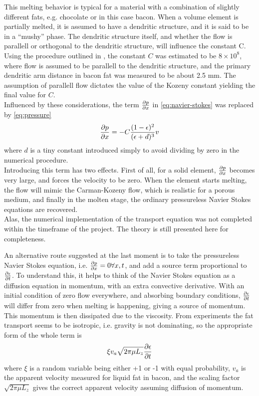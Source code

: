 This melting behavior is typical for a material with a combination of slightly different
fats, e.g. chocolate or in this case bacon. When a volume element is partially
melted, it is assumed to have a dendritic structure, and it is said to be in a
``mushy'' phase. The dendritic structure itself, and whether the flow is parallell or
orthogonal to the dendritic structure, will influence the constant C. \\

Using the procedure outlined in \cite{poirier}, the constant $C$ was estimated to be
$8 \times 10^8$, where flow is assumed to be parallell to the dendritic
structure, and the primary dendritic arm distance in bacon fat was measured to be
about 2.5 mm. The assumption of parallell flow dictates the value of the Kozeny
constant yielding the final value for $C$.\\

Influenced by these considerations, the term $\frac{\partial p}{\partial x}$ in
\cref{eq:navier-stokes} was replaced by \cref{eq:pressure}
\begin{equation}
  \frac{\partial p}{\partial x} =  -C\frac{ (1-\epsilon)^2}{(\epsilon+d)^3} v
  \label{eq:pressure}
\end{equation}
where $d$ is a tiny constant introduced simply to avoid dividing by zero in the
numerical procedure.\\

Introducing this term has two effects. First of all, for a solid element,
$\frac{\partial p}{\partial x}$ becomes very large, and forces the velocity to be zero. When the
element starts melting, the flow will mimic the Carman-Kozeny flow, which is
realistic for a porous medium, and finally in the molten stage, the ordinary
pressureless Navier Stokes equations are recovered.\\

Alas, the numerical implementation of the transport equation was not completed
within the timeframe of the project. The theory is still presented here for
completeness.

An alternative route suggested at the last moment is to take the pressureless
Navier Stokes equation, i.e. $\frac{\partial p}{\partial x} = 0 \forall x,t$, and add a source term
proportional to $\frac{\partial \epsilon}{\partial t}$. To understand this, it helps to think of the
Navier Stokes equation as a diffusion equation in momentum, with an extra
convective derivative. With an initial condition of zero flow everywhere, and
absorbing boundary conditions, $\frac{\partial \epsilon}{\partial t}$ will differ from zero when
melting is happening, giving a source of momentum. This momentum is then dissipated due to
the viscosity. From experiments the fat transport seems to be isotropic, i.e.
gravity is not dominating, so the appropriate form of the whole term is
\begin{equation}
  \xi v_a \sqrt{2\pi \mu L_z} \frac{\partial \epsilon}{\partial t}
  \label{eq:diffusion}
\end{equation}
where $\xi$ is a random variable being either +1 or -1 with equal probability,
$v_a$ is the apparent velocity measured for liquid fat in bacon, and the scaling
factor $\sqrt{2\pi\mu L_z}$ gives the correct apparent velocity assuming
diffusion of momentum.

